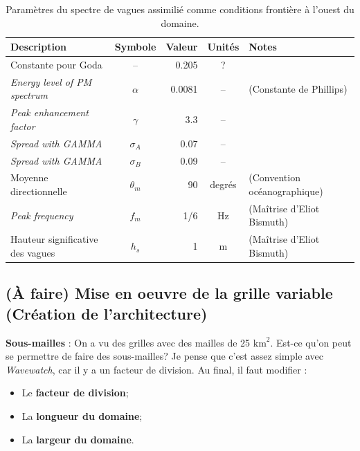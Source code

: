 \documentclass[10pt]{article}
\numberwithin{equation}{section}
\begin{document}
\begin{table}[htbp]
\caption{\label{tab:org361184d}Paramètres du spectre de vagues assimilié comme conditions frontière à l'ouest du domaine.}
\centering
\begin{tabular}{lcrcl}
\hline
\hline
Description & Symbole & Valeur & Unités & Notes\\
\hline
Constante pour Goda & -- & 0.205 & ? & \Textcite{goda1988variablity}\\
\emph{Energy level of PM spectrum} & \(\alpha\) & 0.0081 & -- & \Textcite{wwiii2016user} (Constante de Phillips)\\
\emph{Peak enhancement factor} & \(\gamma\) & 3.3 & -- & \Textcite{hasselmann1973measurements,wwiii2016user}\\
\emph{Spread with GAMMA} & \(\sigma_A\) & 0.07 & -- & \Textcite{hasselmann1973measurements,wwiii2016user}\\
\emph{Spread with GAMMA} & \(\sigma_B\) & 0.09 & -- & \Textcite{hasselmann1973measurements,wwiii2016user}\\
Moyenne directionnelle & \(\theta_m\) & 90 & degrés & \Textcite{wwiii2016user} (Convention océanographique)\\
\hline
\emph{Peak frequency} & \(f_m\) & 1/6 & Hz & (Maîtrise d'Eliot Bismuth)\\
Hauteur significative des vagues & \(h_s\) & 1 & m & (Maîtrise d'Eliot Bismuth)\\
\hline
\end{tabular}
\end{table}
\subsection{(À faire) Mise en oeuvre de la grille variable (Création de l'architecture)}
\label{sec:orge0f6f58}

\textbf{Sous-mailles} : On a vu des grilles avec des mailles de 25 \(\mathrm{km}^2\). Est-ce qu'on peut se permettre de faire des sous-mailles? Je pense que c'est assez simple avec \emph{Wavewatch}, car il y a un facteur de division. Au final, il faut modifier :
\begin{itemize}
\item Le \textbf{facteur de division};
\item La \textbf{longueur du domaine};
\item La \textbf{largeur du domaine}.
\end{itemize}
\end{document}
